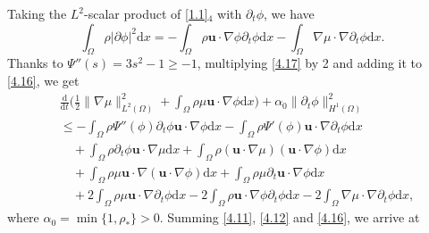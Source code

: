 \documentclass[11pt]{article}
\numberwithin{equation}{section}
\begin{document}
Taking the $L^2$-scalar product of \eqref{1.1}$_{4}$ with $\partial_t\phi$, we have
\begin{equation}\label{4.17}
\int_{\Omega}\rho|\partial\phi|^2\mathrm{d}x = - \int_{\Omega}\rho\mathbf{u}\cdot\nabla\phi\partial_t\phi\mathrm{d}x - \int_{\Omega}\nabla\mu\cdot\nabla\partial_t\phi\mathrm{d}x.
\end{equation}
Thanks to $\Psi''(s) = 3s^2 - 1\geq - 1$, multiplying \eqref{4.17} by 2 and adding it to \eqref{4.16}, we get
\begin{equation}
\begin{split}\label{4.18}
&\frac{\mathrm{d}}{\mathrm{d}t}\Big(\frac{1}{2}\|\nabla\mu\|_{L^2(\Omega)}^2 + \int_{\Omega}\rho\mu\mathbf{u}\cdot\nabla\phi\mathrm{d}x\Big) + \alpha_0\|\partial_t\phi\|_{H^1(\Omega)}^2 \\
&\leq - \int_{\Omega}\rho\Psi''(\phi)\partial_t\phi
\mathbf{u}\cdot\nabla\phi\mathrm{d}x - \int_{\Omega}\rho\Psi'(\phi)\mathbf{u}\cdot\nabla\partial_t\phi\mathrm{d}x \\
&\quad + \int_{\Omega}\rho\partial_t\phi\mathbf{u}\cdot\nabla\mu\mathrm{d}x +\int_{\Omega}\rho(\mathbf{u}\cdot\nabla\mu)
(\boldsymbol{u}\cdot\nabla\phi)\mathrm{d}x \\
&\quad + \int_{\Omega}\rho\mu\mathbf{u}\cdot\nabla(\mathbf{u}\cdot\nabla\phi)\mathrm{d}x + \int_{\Omega}\rho\mu\partial_t\mathbf{u}\cdot\nabla\phi\mathrm{d}x \\
&\quad + 2\int_{\Omega}\rho\mu\mathbf{u}\cdot\nabla\partial_t\phi\mathrm{d}x - 2\int_{\Omega}\rho\mathbf{u}\cdot\nabla\phi\partial_t\phi\mathrm{d}x - 2\int_{\Omega}\nabla\mu\cdot\nabla\partial_t\phi\mathrm{d}x ,
\end{split}
\end{equation}
where $\alpha_0 = \min\{1,\rho_*\}>0$. Summing \eqref{4.11}, \eqref{4.12} and \eqref{4.16}, we arrive at
\end{document}
